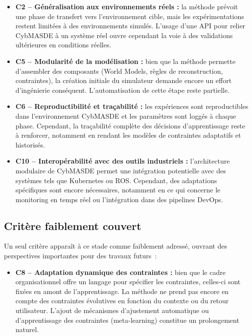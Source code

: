 \begin{itemize}
    \item \textbf{C2 – Généralisation aux environnements réels :} la méthode prévoit une phase de transfert vers l’environnement cible, mais les expérimentations restent limitées à des environnements simulés. L’usage d’une API pour relier CybMASDE à un système réel ouvre cependant la voie à des validations ultérieures en conditions réelles.

    \item \textbf{C5 – Modularité de la modélisation :} bien que la méthode permette d’assembler des composants (World Models, règles de reconstruction, contraintes), la création initiale du simulateur demande encore un effort d’ingénierie conséquent. L’automatisation de cette étape reste partielle.

    \item \textbf{C6 – Reproductibilité et traçabilité :} les expériences sont reproductibles dans l’environnement CybMASDE et les paramètres sont loggés à chaque phase. Cependant, la traçabilité complète des décisions d’apprentissage reste à renforcer, notamment en rendant les modèles de contraintes adaptatifs et historisés.

    \item \textbf{C10 – Interopérabilité avec des outils industriels :} l’architecture modulaire de CybMASDE permet une intégration potentielle avec des systèmes tels que Kubernetes ou ROS. Cependant, des adaptations spécifiques sont encore nécessaires, notamment en ce qui concerne le monitoring en temps réel ou l’intégration dans des pipelines DevOps.
\end{itemize}

\subsection*{Critère faiblement couvert}

Un seul critère apparaît à ce stade comme faiblement adressé, ouvrant des perspectives importantes pour des travaux futurs~:

\begin{itemize}
    \item \textbf{C8 – Adaptation dynamique des contraintes :} bien que le cadre organisationnel offre un langage pour spécifier les contraintes, celles-ci sont fixées en amont de l’apprentissage. La méthode ne prend pas encore en compte des contraintes évolutives en fonction du contexte ou du retour utilisateur. L’ajout de mécanismes d’ajustement automatique ou d’apprentissage des contraintes (meta-learning) constitue un prolongement naturel.
\end{itemize}


